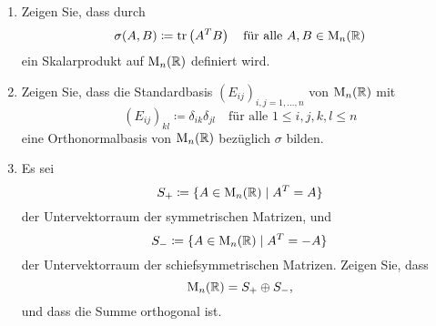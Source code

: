 \documentclass[a4paper,10pt]{scrartcl}
\begin{document}
\begin{question}
  \begin{enumerate}
    \item
      Zeigen Sie, dass durch
      \[
        \sigma(A, B) \coloneqq \operatorname{tr}\left( A^T B \right)
        \quad
        \text{für alle $A, B \in \operatorname{M}_n(\mathbb{R})$}
      \]
      ein Skalarprodukt auf $\operatorname{M}_n(\mathbb{R})$ definiert wird.
    \item
      Zeigen Sie, dass die Standardbasis $(E_{ij})_{i,j=1,\dotsc,n}$ von $\operatorname{M}_n(\mathbb{R})$ mit
      \[
        (E_{ij})_{kl} \coloneqq \delta_{ik} \delta_{jl}
        \quad
        \text{für alle $1 \leq i,j,k,l \leq n$}
      \]
      eine Orthonormalbasis von $\operatorname{M}_n(\mathbb{R})$ bezüglich $\sigma$ bilden.
    \item
      Es sei
      \[
        S_+ \coloneqq \{A \in \operatorname{M}_n(\mathbb{R}) \mid A^T = A\}
      \]
      der Untervektorraum der symmetrischen Matrizen, und
      \[
        S_- \coloneqq \{A \in \operatorname{M}_n(\mathbb{R}) \mid A^T  = -A\}
      \]
      der Untervektorraum der schiefsymmetrischen Matrizen.
      Zeigen Sie, dass
      \[
        \operatorname{M}_n(\mathbb{R}) = S_+ \oplus S_-,
      \]
      und dass die Summe orthogonal ist.
  \end{enumerate}
\end{question}










\end{document}
